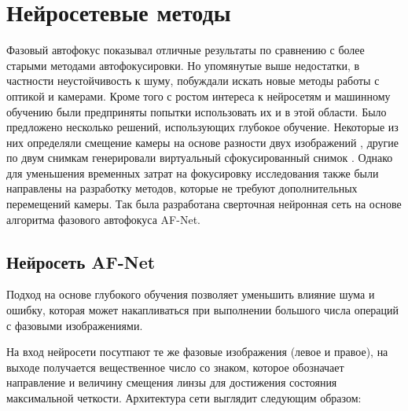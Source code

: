 \section{Нейросетевые методы} \label{ch1:sec2} 
Фазовый автофокус показывал отличные результаты по сравнению с более старыми методами автофокусировки. Но упомянутые выше недостатки, в частности неустойчивость к шуму, побуждали искать новые методы работы с оптикой и камерами. Кроме того с ростом интереса к нейросетям и машинному обучению были предприняты попытки использовать их и в этой области. Было предложено несколько решений, использующих глубокое обучение. Некоторые из них определяли смещение камеры на основе разности двух изображений \cite{RaiDastidar}, другие по двум снимкам генерировали виртуальный сфокусированный снимок \cite{li2020rapid}. Однако для уменьшения временных затрат на фокусировку исследования также были направлены на разработку методов, которые не требуют дополнительных перемещений камеры. Так была разработана сверточная нейронная сеть на основе алгоритма фазового автофокуса AF-Net.

\subsection{Нейросеть AF-Net}
Подход на основе глубокого обучения \cite{AF-Net} позволяет уменьшить влияние шума и ошибку, которая может накапливаться при выполнении большого числа операций с фазовыми изображениями.

На вход нейросети посутпают те же фазовые изображения (левое и правое), на выходе получается вещественное число со знаком, которое обозначает направление и величину смещения линзы для достижения состояния максимальной четкости. Архитектура сети выглядит следующим образом:

